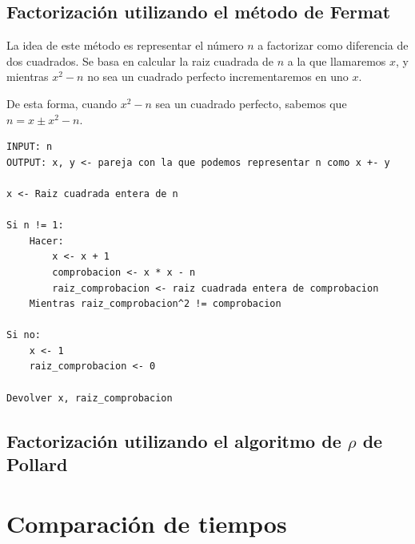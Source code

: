 \documentclass[12pt, spanish]{article}
\begin{document}
\subsection{Factorización utilizando el método de Fermat}

La idea de este método es representar el número $n$ a factorizar como diferencia de dos cuadrados. Se basa en calcular la raiz cuadrada de $n$ a la que llamaremos $x$, y mientras $x^2 - n$ no sea un cuadrado perfecto incrementaremos en uno $x$.

De esta forma, cuando $x^2 - n$ sea un cuadrado perfecto, sabemos que $n = x \pm x^2 - n$.


\begin{lstlisting}[caption={Algoritmo raices cuadradas mod p*q}]
INPUT: n
OUTPUT: x, y <- pareja con la que podemos representar n como x +- y

x <- Raiz cuadrada entera de n

Si n != 1:
 	Hacer:
		x <- x + 1
		comprobacion <- x * x - n
		raiz_comprobacion <- raiz cuadrada entera de comprobacion
	Mientras raiz_comprobacion^2 != comprobacion

Si no:
	x <- 1
	raiz_comprobacion <- 0

Devolver x, raiz_comprobacion
\end{lstlisting}



\subsection{Factorización utilizando el algoritmo de $\rho$ de Pollard}



\section{Comparación de tiempos}


%
%
\end{document}
